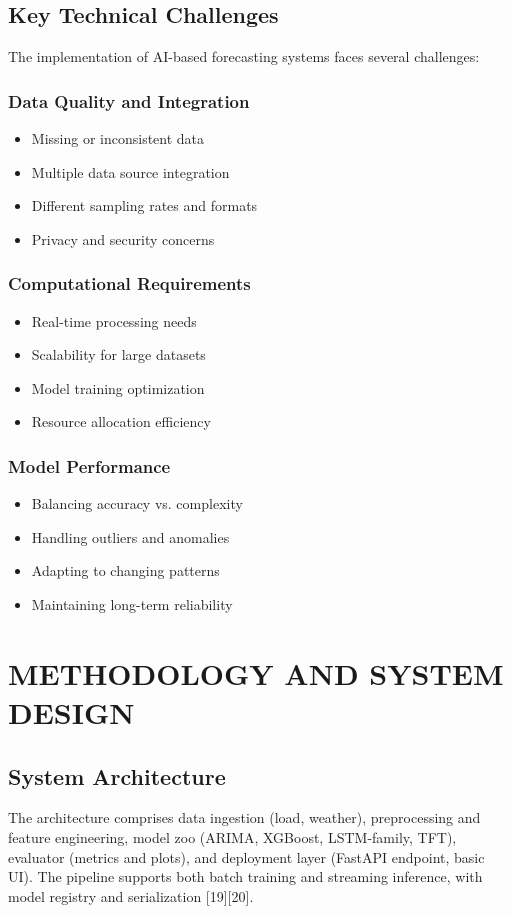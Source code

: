 \documentclass[12pt,a4paper]{report}
\begin{document}
\section{Key Technical Challenges}
The implementation of AI-based forecasting systems faces several challenges:

\subsection{Data Quality and Integration}
\begin{itemize}
\item Missing or inconsistent data
\item Multiple data source integration
\item Different sampling rates and formats
\item Privacy and security concerns
\end{itemize}

\subsection{Computational Requirements}
\begin{itemize}
\item Real-time processing needs
\item Scalability for large datasets
\item Model training optimization
\item Resource allocation efficiency
\end{itemize}

\subsection{Model Performance}
\begin{itemize}
\item Balancing accuracy vs. complexity
\item Handling outliers and anomalies
\item Adapting to changing patterns
\item Maintaining long-term reliability
\end{itemize}


\chapter{METHODOLOGY AND SYSTEM DESIGN}
\section{System Architecture}
The architecture comprises data ingestion (load, weather), preprocessing and feature engineering, model zoo (ARIMA, XGBoost, LSTM-family, TFT), evaluator (metrics and plots), and deployment layer (FastAPI endpoint, basic UI). The pipeline supports both batch training and streaming inference, with model registry and serialization [19][20].
\end{document}
